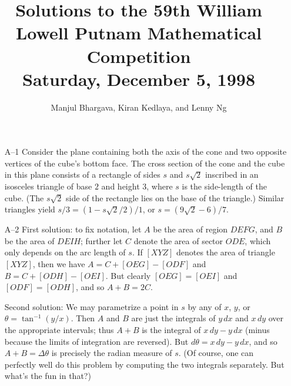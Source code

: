 \documentclass[amssymb,twocolumn,pra,10pt,aps]{revtex4-1}
\begin{document}
\title{Solutions to the 59th William Lowell Putnam Mathematical Competition \\
    Saturday, December 5, 1998}
\author{Manjul Bhargava, Kiran Kedlaya, and Lenny Ng}
\noaffiliation
\maketitle

\begin{itemize}
\item[A--1]
Consider the plane containing both the axis of the cone and two opposite
vertices of the cube's bottom face.  The cross section of the cone and
the cube in this plane consists of a rectangle of sides $s$ and
$s\sqrt{2}$ inscribed in an isosceles triangle of base $2$ and height
$3$, where $s$ is the side-length of the cube.  (The $s\sqrt{2}$ side
of the rectangle lies on the base of the triangle.)  Similar triangles
yield $s/3 = (1-s\sqrt{2}/2)/1$, or $s = (9\sqrt{2} - 6)/7.$

\item[A--2]
First solution:
to fix notation, let $A$ be the area
of region $DEFG$, and $B$ be the area of $DEIH$; further
let $C$ denote the area of sector $ODE$, which only depends on the
arc length of $s$.  If $[XYZ]$ denotes the area of triangle
$[XYZ]$, then we have
$A = C + [OEG] - [ODF]$ and $B = C + [ODH] - [OEI]$.  But
clearly $[OEG] = [OEI]$ and $[ODF] = [ODH]$, and so
$A + B = 2C$.

\begin{center}
\end{center}

Second solution: We may parametrize a point in $s$ by any of
$x$, $y$, or $\theta = \tan^{-1} (y/x)$.  Then $A$ and $B$ are
just the integrals of $y\,dx$ and $x\,dy$ over the appropriate
intervals; thus $A+B$ is the integral of $x\,dy - y\,dx$
(minus because the limits of integration are reversed).
But $d\theta = x\,dy - y\,dx$, and so $A+B = \Delta \theta$
is precisely the radian measure of $s$. (Of course, one can perfectly well
do this problem by computing the two integrals
separately. But what's the fun in that?)


\end{itemize}
\end{document}

